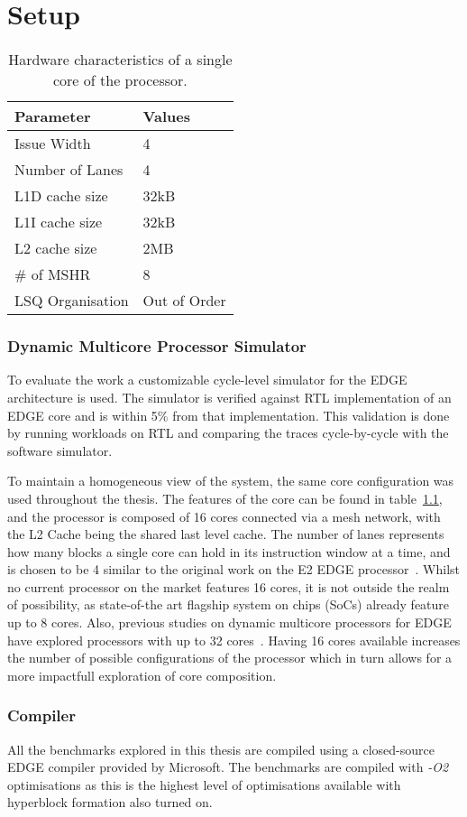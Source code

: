\chapter{Setup}\label{chp:setup}

\begin{table}[ht]
\centering
\begin{singlespace}
\begin{tabular} { p{5cm}  p{5cm} }
      \toprule
      \textbf{Parameter} & \textbf{Values} \\ \midrule
	  Issue Width & 4  \\
	  Number of Lanes & 4 \\
      L1D cache size & 32kB \\
      L1I cache size & 32kB \\
	  L2 cache size & 2MB \\
	  \# of MSHR & 8 \\
	  LSQ Organisation & Out of Order \\
	  
	  \end{tabular}
	  \end{singlespace}
  \caption{Hardware characteristics of a single core of the processor.}
  \label{tab:processor}
\end{table}

\subsection{Dynamic Multicore Processor Simulator}\label{chp:setup:conf}

To evaluate the work a customizable cycle-level simulator for the EDGE architecture is used.
The simulator is verified against RTL implementation of an EDGE core and is within 5\% from that implementation.
This validation is done by running workloads on RTL and comparing the traces cycle-by-cycle with the software simulator.

To maintain a homogeneous view of the system, the same core configuration was used throughout the thesis.
The features of the core can be found in table~\ref{tab:processor}, and the processor is composed of 16 cores connected via a mesh network, with the L2 Cache being the shared last level cache.
The number of lanes represents how many blocks a single core can hold in its instruction window at a time, and is chosen to be 4 similar to the original work on the E2 EDGE processor~\cite{putnam2010e2}.
Whilst no current processor on the market features 16 cores, it is not outside the realm of possibility, as state-of-the art flagship system on chips (SoCs) already feature up to 8 cores.
Also, previous studies on dynamic multicore processors for EDGE have explored processors with up to 32 cores~\cite{kim2007tflex, gulati2008multitaskingdmc}.
Having 16 cores available increases the number of possible configurations of the processor which in turn allows for a more impactfull exploration of core composition.

\subsection{Compiler}

All the benchmarks explored in this thesis are compiled using a closed-source EDGE compiler provided by Microsoft.
The benchmarks are compiled with \textit{-O2} optimisations as this is the highest level of optimisations available with hyperblock formation also turned on.